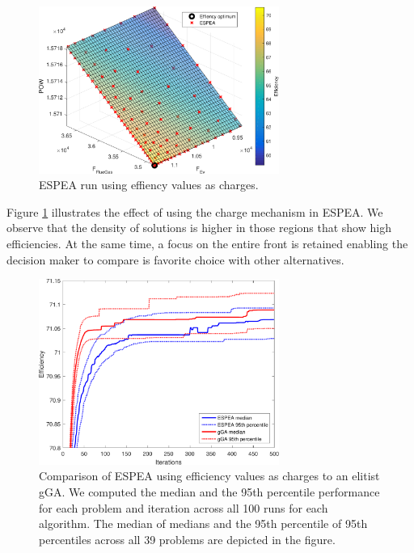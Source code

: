 \begin{figure}
\centering
\includegraphics[width=0.7\textwidth]{figures/espeacharge_cropped.pdf}
\caption{ESPEA run using effiency values as charges.}
\label{fig:espea}
\end{figure}

Figure \ref{fig:espea} illustrates the effect of using the charge mechanism in ESPEA. We observe that the density of solutions is higher in those regions that show high efficiencies. At the same time, a focus on the entire front is retained enabling the decision maker to compare is favorite choice with other alternatives.

\begin{figure}
\centering
\includegraphics[width=0.7\textwidth]{figures/efficiency_cropped.pdf}
\caption{Comparison of ESPEA using efficiency values as charges to an elitist gGA. We computed the median and the 95th percentile performance for each problem and iteration across all 100 runs for each algorithm. The median of medians and the 95th percentile of 95th percentiles across all 39 problems are depicted in the figure.}
\label{fig:efficiency}
\end{figure}

